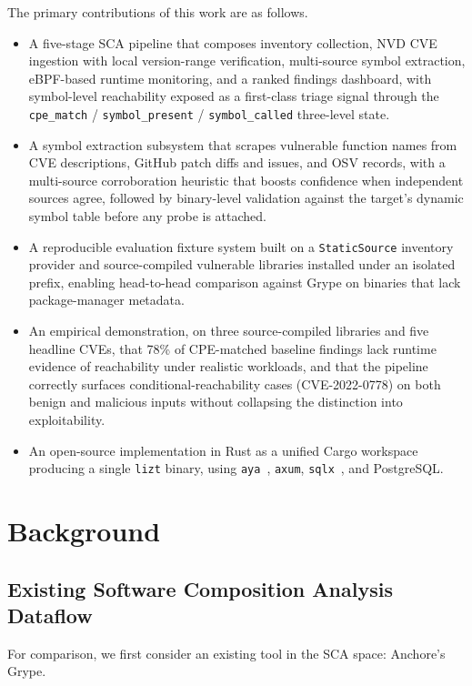 \documentclass[conference]{IEEEtran}
\begin{document}
The primary contributions of this work are as follows.
\begin{itemize}[noitemsep]
  \item A five-stage SCA pipeline that composes inventory
        collection, NVD CVE ingestion with local version-range
        verification, multi-source symbol extraction, eBPF-based
        runtime monitoring, and a ranked findings dashboard, with
        symbol-level reachability exposed as a first-class triage
        signal through the \texttt{cpe\_match} /
        \texttt{symbol\_present} / \texttt{symbol\_called}
        three-level state.
  \item A symbol extraction subsystem that scrapes vulnerable
        function names from CVE descriptions, GitHub patch
        diffs and issues, and OSV records, with a multi-source
        corroboration heuristic that boosts confidence when
        independent sources agree, followed by binary-level
        validation against the target's dynamic symbol table
        before any probe is attached.
  \item A reproducible evaluation fixture system built on a
        \texttt{StaticSource} inventory provider and
        source-compiled vulnerable libraries installed under an
        isolated prefix, enabling head-to-head comparison against
        Grype on binaries that lack package-manager metadata.
  \item An empirical demonstration, on three source-compiled
        libraries and five headline CVEs, that 78\% of CPE-matched
        baseline findings lack runtime evidence of reachability
        under realistic workloads, and that the pipeline correctly
        surfaces conditional-reachability cases
        (CVE-2022-0778) on both benign and malicious inputs
        without collapsing the distinction into exploitability.
  \item An open-source implementation in Rust as a unified Cargo
        workspace producing a single \texttt{lizt} binary, using
        \texttt{aya}~\cite{aya}, \texttt{axum}, \texttt{sqlx}~\cite{sqlx},
        and PostgreSQL.
\end{itemize}


\section{Background}

\subsection{Existing Software Composition Analysis Dataflow}
For comparison, we first consider an existing tool in the SCA space: Anchore's Grype.
\end{document}
